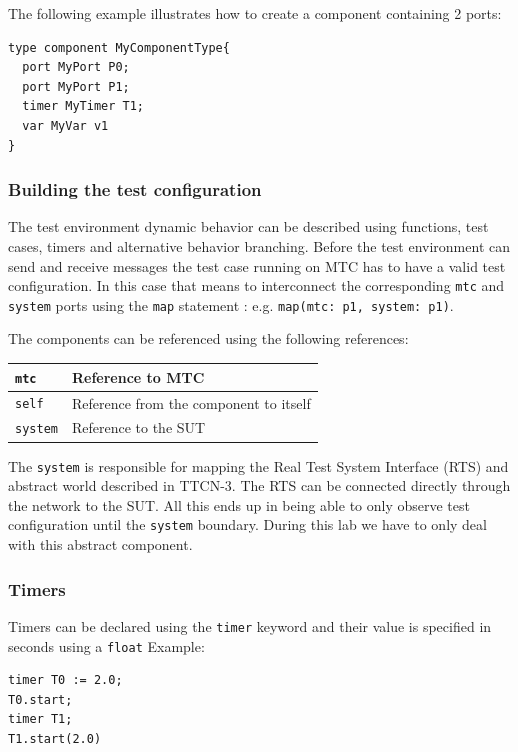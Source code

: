 \documentclass[a4paper]{article}
\begin{document}
The following example illustrates how to create a component containing 2 ports:

{\footnotesize
\begin{lstlisting}
type component MyComponentType{
  port MyPort P0;
  port MyPort P1;
  timer MyTimer T1;
  var MyVar v1
}
\end{lstlisting}
}

\subsubsection{Building the test configuration}

The test environment dynamic behavior can be described using functions, test cases, timers and alternative behavior
branching. Before the test environment can send and receive messages the test case running on MTC has to have a valid
test configuration. In this case that means to interconnect the corresponding \verb!mtc! and
\verb!system! ports using the \verb/map/ statement : e.g.
\verb!map(mtc: p1, system: p1)!.

The components can be referenced using the following references:

{\footnotesize
\begin{tabular}{|l|p{11cm}|}
    \hline
    \verb/mtc/ & Reference to MTC                        \\
    \hline
    \verb/self/ & Reference from the component to itself  \\
    \hline
    \verb/system/ & Reference to the SUT                    \\
    \hline
\end{tabular}
}

The \verb/system/ is responsible for mapping the Real Test System Interface (RTS) and abstract world
described in TTCN-3.
The RTS can be connected directly through the network to the SUT.
All this ends up in being able to only observe test configuration until the \verb/system/ boundary.
During this lab we have to only deal with this abstract component.

\subsubsection{Timers}
Timers can be declared using the \verb/timer/ keyword and their value is specified in seconds using a
\verb.float. Example:
{\footnotesize
\begin{lstlisting}
timer T0 := 2.0;
T0.start;
timer T1;
T1.start(2.0)
\end{lstlisting}
}
\end{document}

